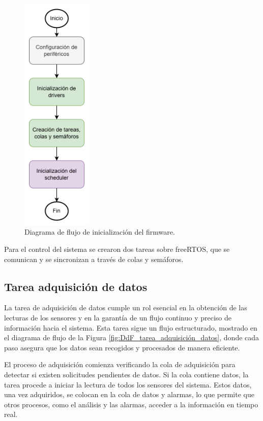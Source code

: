 \vspace{1cm}
\begin{figure}[htbp]
	\centering
	\includegraphics[width=0.3\textwidth, height=0.6\textheight]{./Figures/DdF_firmware.png}
	\caption{Diagrama de flujo de inicialización del firmware.}
	\label{fig:DdF_firmware}
\end{figure}
\vspace{1cm}

Para el control del sistema se crearon dos tareas sobre freeRTOS, que se comunican
y se sincronizan a través de colas y semáforos.

\newpage

\subsection{Tarea adquisición de datos}

La tarea de adquisición de datos cumple un rol esencial en la obtención de las lecturas de los sensores y en la garantía de un flujo continuo y preciso de información hacia el sistema. Esta tarea sigue un flujo estructurado, mostrado en el diagrama de flujo de la Figura \ref{fig:DdF_tarea_adquisición_datos}, donde cada paso asegura que los datos sean recogidos y procesados de manera eficiente.

El proceso de adquisición comienza verificando la cola de adquisición para detectar si existen solicitudes pendientes de datos. Si la cola contiene datos, la tarea procede a iniciar la lectura de todos los sensores del sistema. Estos datos, una vez adquiridos, se colocan en la cola de datos y alarmas, lo que permite que otros procesos, como el análisis y las alarmas, acceder a la información en tiempo real.

